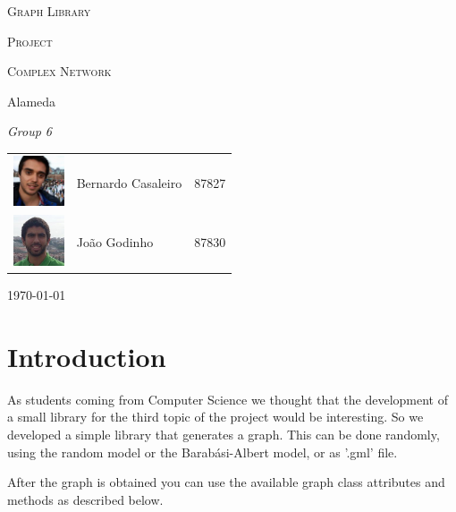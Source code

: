 \documentclass[a4paper,titlepage,11pt]{article}
\begin{document}
\begin{titlepage}
  \begin{center}
    {\scshape \huge Graph Library \par}
    \vspace{1cm}

    {\scshape \LARGE Project \par}
    \vspace{1.5cm}

    {\scshape \Large Complex Network \par}
    \vspace{0.5cm}

    {\Large Alameda \par}
    \vfill

    {\itshape \Large Group 6 \par}
    \vfill

    \begin{tabular}{l l l}
      \includegraphics[width=15mm, height=15mm]{img/bernardo.jpeg} & Bernardo Casaleiro & 87827\\
      \includegraphics[width=15mm, height=15mm]{img/joao.jpeg} & João Godinho & 87830\\
    \end{tabular}
    \vfill

    {\large \today\par}
  \end{center}
\end{titlepage}

\section{Introduction}
As students coming from Computer Science we thought that the development of a small library for the third topic of the project would be interesting.
So we developed a simple library that generates a graph. This can be done randomly, using the random model or the Barabási-Albert model, or as '.gml' file.

After the graph is obtained you can use the available graph class attributes and methods as described below.
\end{document}
